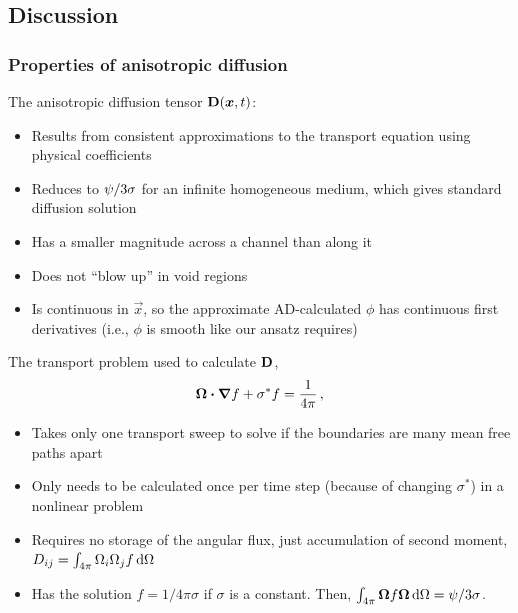 \documentclass{beamer}
\begin{document}
\subsection{Discussion}
\begin{frame}
  \frametitle{Properties of anisotropic diffusion}

  The anisotropic diffusion tensor $\mathbf{D}(\bm{x},t)$: 
  \begin{itemize}
    \item Results from consistent approximations to the transport equation
      using physical coefficients
    \item Reduces to $\mathbf{\psi}/3\sigma$ for an infinite homogeneous
      medium, which gives standard diffusion solution
    \item Has a smaller magnitude across a channel than along it
    \item Does not ``blow up'' in void regions
    \item Is continuous in $\vec{x}$, so the approximate AD-calculated $\phi$
      has continuous first derivatives (i.e., $\phi$ is smooth like our ansatz
      requires)
  \end{itemize}
\end{frame}

\begin{frame}
  The transport problem used to calculate $\mathbf{D}$,
  \begin{equation*}
    \bm{\Omega}\bm{\cdot} \bm{\nabla} f + \sigma^* f = \frac{1}{4\pi} \,,
  \end{equation*}
  \vspace{-\baselineskip}
  \begin{itemize}
    \item Takes only one transport sweep to solve if the boundaries are many
      mean free paths apart
    \item Only needs to be calculated once per time step (because of changing
      $\sigma^*$) in a nonlinear problem \item Requires no storage of the
      angular flux, just accumulation of second moment, $D_{ij} =
      \int_{4\pi} \Omega_i \Omega_j f \mathop{}\!\mathrm{d}\Omega$
    \item Has the solution $f=1/4\pi\sigma$ if $\sigma$ is a constant.
      Then, $\int_{4\pi} \bm{\Omega} f \bm{\Omega} \mathop{}\!\mathrm{d}\Omega =
      \mathbf{\psi}/3\sigma$.
  \end{itemize}
\end{frame}
\end{document}
